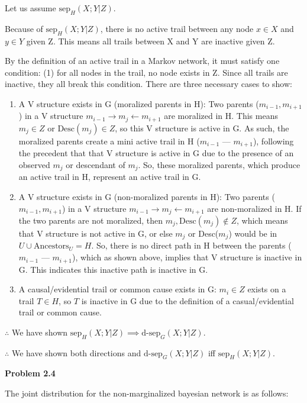 \documentclass[12pt]{article}
\begin{document}
Let us assume $\text{sep}_H(X; Y \vert Z)$.

Because of $\text{sep}_H(X; Y \vert Z)$, there is no active trail between any node $x\in X$ and $y\in Y$ given Z. This means all trails between X and Y are inactive given Z.

By the definition of an active trail in a Markov network, it must satisfy one condition: (1) for all nodes in the trail, no node exists in Z. Since all trails are inactive, they all break this condition. There are three necessary cases to show:

\begin{enumerate}
	\item A V structure exists in G (moralized parents in H): Two parents ($m_{i-1}, m_{i+1}$) in a V structure $m_{i-1} \rightarrow m_j \leftarrow m_{i+1}$ are moralized in H. This means $m_j\in Z$ or $\text{Desc}(m_j)\in Z$, so this V structure is active in G. As such, the moralized parents create a mini active trail in H ($m_{i-1}$ --- $m_{i+1}$), following the precedent that that V structure is active in G due to the presence of an observed $m_j$ or descendant of $m_j$. So, these moralized parents, which produce an active trail in H, represent an active trail in G.
	\item A V structure exists in G (non-moralized parents in H): Two parents ($m_{i-1}, m_{i+1}$) in a V structure $m_{i-1} \rightarrow m_j \leftarrow m_{i+1}$ are non-moralized in H. If the two parents are not moralized, then $m_j, \text{Desc}(m_j)\notin Z$, which means that V structure is not active in G, or else $m_j$ or Desc($m_j$) would be in $U \cup \text{Ancestors}_U = H$. So, there is no direct path in H between the parents ($m_{i-1}$ --- $m_{i+1}$), which as shown above, implies that V structure is inactive in G. This indicates this inactive path is inactive in G.
	\item A causal/evidential trail or common cause exists in G: $m_i\in Z$ exists on a trail $T \in H$, so $T$ is inactive in G due to the definition of a casual/evidential trail or common cause.
\end{enumerate}

$\therefore$ We have shown $\text{sep}_H(X; Y \vert Z) \implies \text{d-sep}_G(X; Y \vert Z)$.

$\therefore$ We have shown both directions and $\text{d-sep}_G(X; Y \vert Z)$ iff $\text{sep}_H(X; Y \vert Z)$.

\pagebreak\textbf{Problem 2.4}

The joint distribution for the non-marginalized bayesian network is as follows:
\end{document}
